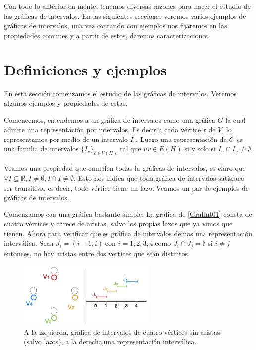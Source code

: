 Con todo lo anterior en mente, tenemos diversas razones para hacer el estudio de las gráficas de intervalos. En las siguientes secciones veremos varios ejemplos de gráficas de intervalos, una vez contando con ejemplos nos fijaremos en las propiedades comunes y a partir de estos, daremos caracterizaciones.

\section{Definiciones y ejemplos}
En ésta sección comenzamos el estudio  de las gráficas de intervalos. Veremos algunos ejemplos y propiedades de estas.

Comencemos, entendemos a un gráfica de intervalos como una gráfica $G$ la cual admite una representación por intervalos. Es decir a cada vértice $v$ de $V$, lo representamos por medio de un intervalo $I_v$. Luego una representación de $G$ es una familia de intervalos $\{ I_v \}_{v\in V(H)}$ tal que $uv\in E(H)$ si y solo si $I_u \cap I_v \neq \emptyset$.

Veamos una propiedad que cumplen todas la gráficas de intervalos, es claro que $\forall I\subseteq \mathbb{R}, I\neq \emptyset, I\cap I \neq \emptyset$. Esto nos indica que toda gráfica de intervalos satisface ser transitiva, es decir, todo vértice tiene un lazo.
Veamos un par de ejemplos de gráficas de intervalos.


Comenzamos con una gráfica bastante simple. La gráfica de \cref{GrafInt01} consta de cuatro vértices y carece de aristas, salvo los propias lazos que ya vimos que tienen. Ahora para verificar que es gráfica de intervalos demos una representación interválica. Sean $J_i = (i-1, i)$ con $i=1,2,3,4$ como $J_i \cap J_j = \emptyset$ si $i\neq j$ entonces,  no hay aristas entre dos vértices que sean distintos.    

\begin{figure}[H]
  \centering
  \includegraphics[width=0.6\textwidth]{recursos/capturas/201}
  \caption{A la izquierda, gráfica de intervalos de cuatro vértices sin aristas (salvo lazos), a la derecha,una representación interválica.}
  \label{fig:GrafInt01}
\end{figure}



